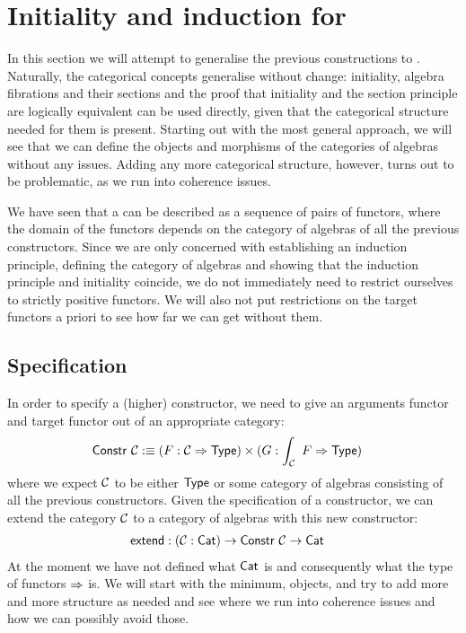 \documentclass[a4paper,10pt]{article}
\begin{document}
\section{Initiality and induction for \hits}
\label{sec:hits}

In this section we will attempt to generalise the previous
constructions to \hits. Naturally, the categorical concepts generalise
without change: initiality, algebra fibrations and their sections and
the proof that initiality and the section principle are logically
equivalent can be used directly, given that the categorical structure
needed for them is present. Starting out with the most general
approach, we will see that we can define the objects and morphisms of
the categories of algebras without any issues. Adding any more
categorical structure, however, turns out to be problematic, as we run
into coherence issues.

We have seen that a \hit can be described as a sequence of pairs of
functors, where the domain of the functors depends on the category of
algebras of all the previous constructors. Since we are only concerned
with establishing an induction principle, defining the category of
algebras and showing that the induction principle and initiality
coincide, we do not immediately need to restrict ourselves to strictly
positive functors. We will also not put restrictions on the target
functors a priori to see how far we can get without them.

\subsection{Specification}
\label{sec:hitspec}

In order to specify a (higher) constructor, we need to give an
arguments functor and target functor out of an appropriate category:
%
\begin{align*}
  &\mathsf{Constr}\ \mathcal{C} :\equiv (F : \mathcal{C} \Rightarrow \mathsf{Type}) \times (G : \int_{\mathcal{C}}\ F \Rightarrow \mathsf{Type})
\end{align*}
%
where we expect $\mathcal{C}$ to be either $\mathsf{Type}$ or some category of algebras
consisting of all the previous constructors. Given the specification
of a constructor, we can extend the category $\mathcal{C}$ to a category of
algebras with this new constructor:
%
\begin{align*}
  &\mathsf{extend} : (\mathcal{C} : \mathsf{Cat}) \to \mathsf{Constr}\ \mathcal{C} \to \mathsf{Cat}
\end{align*}
%
At the moment we have not defined what $\mathsf{Cat}$ is and consequently what
the type of functors $\Rightarrow$ is. We will start with the minimum, \ie
objects, and try to add more and more structure as needed and see
where we run into coherence issues and how we can possibly avoid
those.
\end{document}
